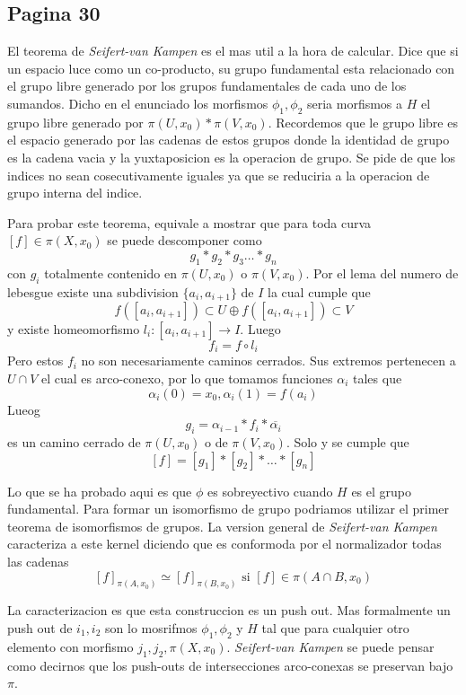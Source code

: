 \documentclass[letterpaper]{article}
\newcommand{\vank}{\emph{Seifert-van Kampen} }
\begin{document}
\subsection*{Pagina 30}
El teorema de \vank es el mas util a la hora de calcular. Dice que si un
espacio luce como un co-producto, su grupo fundamental esta relacionado
con el grupo libre generado por los grupos fundamentales de cada uno de
los sumandos. Dicho en el enunciado los morfismos \(\phi_1, \phi_2\)
seria morfismos a \(H\) el grupo libre generado por \(\pi (U,x_0) * \pi
(V,x_0)\). Recordemos que le grupo libre es el espacio generado por las
cadenas de estos grupos donde la identidad de grupo es la cadena vacia y
la yuxtaposicion es la operacion de grupo. Se pide de que los indices no
sean cosecutivamente iguales ya que se reduciria a la operacion de grupo
interna del indice.

Para probar este teorema, equivale a mostrar que para toda curva \([f]
\in \pi (X,x_0)\) se puede descomponer como
\[ g_1 * g_2 * g_3 \dots * g_n \]
con \(g_i\) totalmente contenido en \(\pi (U, x_0)\) o \(\pi (V, x_0)\).
Por el lema del numero de lebesgue existe una subdivision \(\{a_i ,
a_{i+1}\}\) de \(I\) la cual cumple que
\[ f \left( [a_i , a_{i+1}] \right) \subset U  \oplus f \left( [a_i ,
    a_{i+1}] \right) \subset V \]
y existe homeomorfismo \(l_i : [a_i , a_{i+1}] \to I \). Luego
\[ f_i = f \circ l_i \]
Pero estos \(f_i\) no son necesariamente caminos cerrados. Sus extremos
pertenecen a \(U \cap V\) el cual es arco-conexo, por lo que tomamos
funciones \(\alpha_i\) tales que
\[ \alpha_i (0) = x_0 , \alpha_i (1) = f(a_i)\]
Lueog
\[ g_i = \alpha_{i-1} * f_i * \overline{\alpha_i} \]
es un camino cerrado de \(\pi(U, x_0)\) o de \(\pi (V,x_0)\). Solo y se
cumple que
\[ [f] = [g_1] * [g_2] * \dots * [g_n] \]

Lo que se ha probado aqui es que \(\phi\) es sobreyectivo cuando \(H\)
es el grupo fundamental. Para formar un isomorfismo de grupo podriamos
utilizar el primer teorema de isomorfismos de grupos. La version general
de \vank caracteriza a este kernel diciendo que es conformoda por el
normalizador todas las cadenas
\[ [f]_{\pi (A,x_0)} \simeq [f]_{\pi (B, x_0)} \text{ si } [f] \in \pi
  (A \cap B, x_0) \]

La caracterizacion es que esta construccion es un push out. Mas
formalmente un push out de \(i_1, i_2\) son lo mosrifmos \(\phi_1,
\phi_2\) y \(H\) tal que para cualquier otro elemento con morfismo
\(j_1, j_2 , \pi (X,x_0)\). \vank se puede pensar como decirnos que los
push-outs de intersecciones arco-conexas se preservan bajo \(\pi\).
\end{document}
